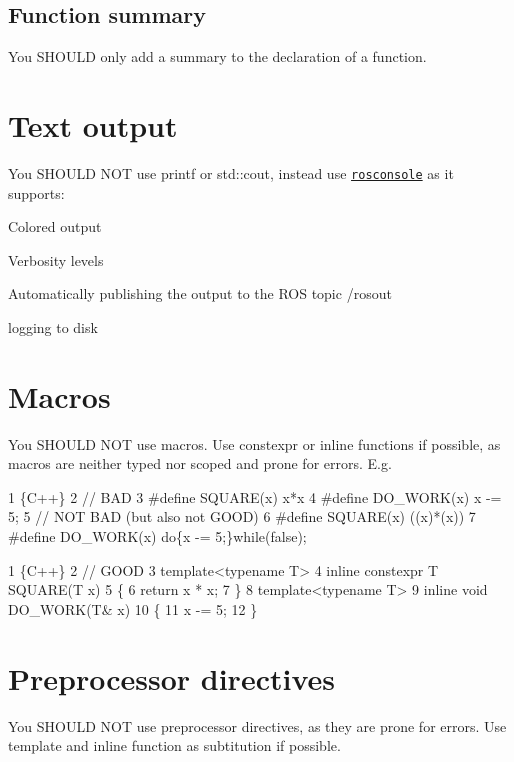 \subsection*{Function summary}

You S\+H\+O\+U\+LD only add a summary to the declaration of a function.

\section*{Text output}

You S\+H\+O\+U\+LD N\+OT use {\ttfamily printf} or {\ttfamily std\+::cout}, instead use \href{http://wiki.ros.org/rosconsole}{\tt rosconsole} as it supports\+:


\begin{DoxyItemize}
\item Colored output
\item Verbosity levels
\item Automatically publishing the output to the R\+OS topic {\ttfamily /rosout}
\item logging to disk
\end{DoxyItemize}

\section*{Macros}

You S\+H\+O\+U\+LD N\+OT use macros. Use {\ttfamily constexpr} or {\ttfamily inline} functions if possible, as macros are neither typed nor scoped and prone for errors. E.\+g. 
\begin{DoxyCode}
1 \{C++\}
2 // BAD
3 #define SQUARE(x) x*x
4 #define DO\_WORK(x) x -= 5;
5 // NOT BAD (but also not GOOD)
6 #define SQUARE(x) ((x)*(x))
7 #define DO\_WORK(x) do\{x -= 5;\}while(false);
\end{DoxyCode}
 
\begin{DoxyCode}
1 \{C++\}
2 // GOOD
3 template<typename T>
4 inline constexpr T SQUARE(T x)
5 \{
6     return x * x;
7 \}
8 template<typename T>
9 inline void DO\_WORK(T& x)
10 \{
11     x -= 5;
12 \}
\end{DoxyCode}


\section*{Preprocessor directives}

You S\+H\+O\+U\+LD N\+OT use preprocessor directives, as they are prone for errors. Use {\ttfamily template} and {\ttfamily inline} function as subtitution if possible.

